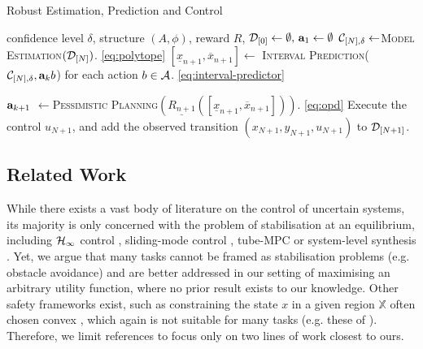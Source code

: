 \documentclass{article}
\begin{document}
\begin{algorithm}[tb]
	\caption{Robust Estimation, Prediction and Control}
	\label{alg:full}
	\begin{algorithmic}
		 confidence level $\delta$, structure $(A,\phi)$, reward $R$, $\mathcal{D}_{[0]}\gets\emptyset,\, \mathbf{a}_1\gets\emptyset$
		\STATE $\mathcal{C}_{[N],\delta} \gets$\textsc{Model Estimation}$(\mathcal{D}_{[N]})$. \eqref{eq:polytope}
		\STATE $[\underline{x}_{n+1}, \overline{x}_{n+1}]\gets$ \textsc{Interval Prediction}($\mathcal{C}_{[N],\delta}, \mathbf{a}_kb$) for each action $b\in \mathcal{A}$. \eqref{eq:interval-predictor}

		\STATE $\mathbf{a}_{k+1}$ $\gets$\textsc{Pessimistic Planning}$(\underline{R_{n+1}}([\underline{x}_{n+1}, \overline{x}_{n+1}]))$.  \eqref{eq:opd}
		\ENDFOR
		\STATE Execute the control $u_{N+1}$, and add the observed transition $(x_{N+1}, y_{N+1}, u_{N+1})$ to $\mathcal{D}_{[N+1]}$.
		\ENDFOR
	\end{algorithmic}
\end{algorithm}

\subsection{Related Work}

While there exists a vast body of literature on the control of uncertain systems, its majority is only concerned with the problem of stabilisation at an equilibrium, including $\mathcal{H}_\infty$ control \citep[see, e.g.][]{Basar1996}, sliding-mode control \citep{Lu1997}, tube-MPC \citep{Limon2010} or system-level synthesis \citep{Dean2017,Dean2018}. Yet, we argue that many tasks cannot be framed as stabilisation problems (e.g. obstacle avoidance) and are better addressed in our setting of maximising an arbitrary utility function, where no prior result exists to our knowledge. Other safety frameworks exist, such as constraining the state $x$ in a given region $\mathbb{X}$ often chosen convex \citep[e.g.][]{Turchetta2016}, which again is not suitable for many tasks (e.g. these of ). Therefore, we limit references to focus only on two lines of work closest to ours.
\end{document}
